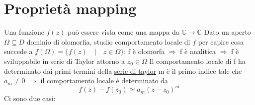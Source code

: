 \documentclass[a4paper,11pt]{report}
\theoremstyle{remark}
\theoremstyle{definition}
\newcommand{\C}{\mathbb{C}}
\begin{document}
\chapter{Proprietà mapping}

	Una funzione $f(z)$ può essere vista come una mappa da $\C \rightarrow \C$ \newline
	Dato un aperto $\Omega \subseteq D$ dominio di olomorfia, studio comportamento locale di $f$ per capire cosa succede a $f(\Omega) = \{f(z) \quad \vert \quad z \in \Omega\}$: \newline
	f è olomorfa $\Rightarrow$ f è analitica $\Rightarrow$ f è sviluppabile in serie di Taylor attorno a $z_0 \in \Omega$ \newline
	Il comportamento locale di f ha determinato dai primi termini della \hyperref[eq:taylor]{serie di taylor} \newline
	m è il primo indice tale che $a_m \neq 0$ $\Rightarrow$ il comportamento locale è determinato da 
	\[f(z)-f(z_0) \simeq a_m(z-z_0)^m\]
	Ci sono due casi:
	
\end{document}
